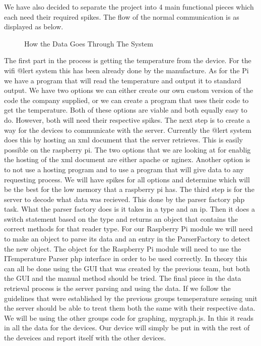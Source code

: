 \documentclass{report}
\begin{document}
We have also decided to separate the project into 4 main functional pieces which each need their required spikes. The flow of the normal communication is as displayed as below.
\begin{figure}[H]
\caption{How the Data Goes Through The System}
\end{figure}
The first part in the process is getting the temperature from the device. 
For the wifi @lert system this has been already done by the manufacture. 
As for the Pi we have a program that will read the temperature and output it to standard output.
We have two options we can either create our own custom version of the code the company supplied, or we can create a program that uses their code to get the temperature.
Both of these options are viable and both equally easy to do. 
However, both will need their respective spikes.
\newline
\indent
The next step is to create a way for the devices to communicate with the server.
Currently the @lert system does this by hosting an xml document that the server retrieves.
This is easily possible on the raspberry pi. 
The two options that we are looking at for enablig the hosting of the xml document are either apache or nginex.
Another option is to not use a hosting program and to use a program that will give data to any requesting process.
We will have spikes for all options and determine which will be the best for the low memory that a raspberry pi has.
\newline
\indent
The third step is for the server to decode what data was recieved. 
This done by the parser factory php task.
What the parser factory does is it takes in a type and an ip.
Then it does a switch statement based on the type and returns an object that contains the correct methods for that reader type.
For our Raspberry Pi module we will need to make an object to parse its data and an entry in the ParserFactory to detect the new object.
The object for the Raspberry Pi module will need to use the ITemperature Parser php interface in order to be used correctly.
In theory this can all be done using the GUI that was created by the previous team, but both the GUI and the manual method should be tried.
\newline
\indent
The final piece in the data retrieval process is the server parsing and using the data. 
If we follow the guidelines that were established by the previous groups temeperature sensing unit the server should be able to treat them both the same with their respective data.
We will be using the other groups code for graphing, mygraph.js.
In this it reads in all the data for the devices. 
Our device will simply be put in with the rest of the deveices and report itself with the other devices.
\newline
\indent
\newpage
\end{document}
